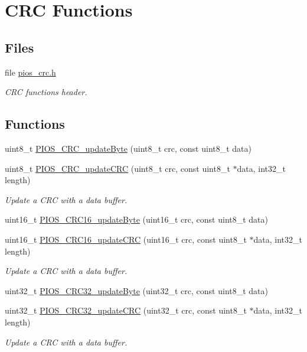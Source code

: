 \hypertarget{group___p_i_o_s___c_r_c}{\section{\-C\-R\-C \-Functions}
\label{group___p_i_o_s___c_r_c}
}
\subsection*{\-Files}
\begin{DoxyCompactItemize}
\item 
file \hyperlink{pios__crc_8h}{pios\-\_\-crc.\-h}
\begin{DoxyCompactList}\small\item\em \-C\-R\-C functions header. \end{DoxyCompactList}\end{DoxyCompactItemize}
\subsection*{\-Functions}
\begin{DoxyCompactItemize}
\item 
uint8\-\_\-t \hyperlink{group___p_i_o_s___c_r_c_ga7a3781ede0c0bbd4c15f6513597e09f8}{\-P\-I\-O\-S\-\_\-\-C\-R\-C\-\_\-update\-Byte} (uint8\-\_\-t crc, const uint8\-\_\-t data)
\item 
uint8\-\_\-t \hyperlink{group___p_i_o_s___c_r_c_ga76c5afc1db85ddf9511c4d993714d094}{\-P\-I\-O\-S\-\_\-\-C\-R\-C\-\_\-update\-C\-R\-C} (uint8\-\_\-t crc, const uint8\-\_\-t $\ast$data, int32\-\_\-t length)
\begin{DoxyCompactList}\small\item\em \-Update a \-C\-R\-C with a data buffer. \end{DoxyCompactList}\item 
uint16\-\_\-t \hyperlink{group___p_i_o_s___c_r_c_gaa0719ccb53a4a29e7123ff950364e2b5}{\-P\-I\-O\-S\-\_\-\-C\-R\-C16\-\_\-update\-Byte} (uint16\-\_\-t crc, const uint8\-\_\-t data)
\item 
uint16\-\_\-t \hyperlink{group___p_i_o_s___c_r_c_ga26ddbe84d2b3c7c295d740bed0a7bc08}{\-P\-I\-O\-S\-\_\-\-C\-R\-C16\-\_\-update\-C\-R\-C} (uint16\-\_\-t crc, const uint8\-\_\-t $\ast$data, int32\-\_\-t length)
\begin{DoxyCompactList}\small\item\em \-Update a \-C\-R\-C with a data buffer. \end{DoxyCompactList}\item 
uint32\-\_\-t \hyperlink{group___p_i_o_s___c_r_c_ga3ee1918a6a3be58dc0554a7c99529f7b}{\-P\-I\-O\-S\-\_\-\-C\-R\-C32\-\_\-update\-Byte} (uint32\-\_\-t crc, const uint8\-\_\-t data)
\item 
uint32\-\_\-t \hyperlink{group___p_i_o_s___c_r_c_ga377c7e542bd4d088e213ca5376afaf9b}{\-P\-I\-O\-S\-\_\-\-C\-R\-C32\-\_\-update\-C\-R\-C} (uint32\-\_\-t crc, const uint8\-\_\-t $\ast$data, int32\-\_\-t length)
\begin{DoxyCompactList}\small\item\em \-Update a \-C\-R\-C with a data buffer. \end{DoxyCompactList}\end{DoxyCompactItemize}


